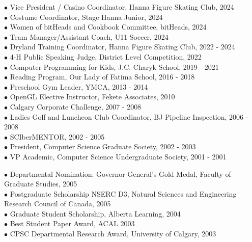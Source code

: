 \documentclass[9pt]{developercv} %
\begin{document}
$\bullet$ Vice President / Casino Coordinator, Hanna Figure Skating Club, 2024
\\ $\bullet$ Costume Coordinator, Stage Hanna Junior, 2024
\\ $\bullet$ Women of bitHeads and Cookbook Committee, bitHeads, 2024 
\\ $\bullet$ Team Manager/Assistant Coach, U11 Soccer, 2024
\\ $\bullet$ Dryland Training Coordinator, Hanna Figure Skating Club, 2022 - 2024
\\ $\bullet$ 4-H Public Speaking Judge, District Level Competition, 2022
\\ $\bullet$ Computer Programming for Kids, J.C. Charyk School, 2019 - 2021
\\ $\bullet$ Reading Program, Our Lady of Fatima School, 2016 - 2018
\\ $\bullet$ Preschool Gym Leader, YMCA,  2013 - 2014
\\ $\bullet$ OpenGL Elective Instructor, Fekete Associates, 2010
\\ $\bullet$ Calgary Corporate Challenge, 2007 - 2008
\\ $\bullet$ Ladies Golf and Luncheon Club Coordinator, BJ Pipeline Inspection, 2006 - 2008 
\\ $\bullet$ SCIberMENTOR, 2002 - 2005
\\ $\bullet$ President, Computer Science Graduate Society, 2002 - 2003
\\ $\bullet$ VP Academic, Computer Science Undergraduate Society, 2001 - 2001


$\bullet$ Departmental Nomination: Governor General's Gold Medal, Faculty of Graduate Studies, 2005
\\ $\bullet$ Postgraduate Scholarship NSERC D3, Natural Sciences and Engineering Research Council of Canada, 2005
\\ $\bullet$ Graduate Student Scholarship, Alberta Learning, 2004
\\ $\bullet$ Best Student Paper Award, ACAL 2003
\\ $\bullet$ CPSC Departmental Research Award, University of Calgary, 2003
\end{document}
